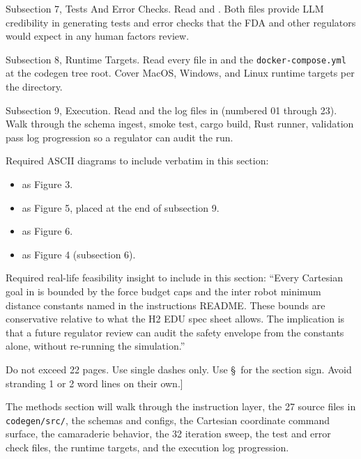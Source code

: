 \begin{sectionaccent}
Subsection 7, Tests And Error Checks. Read
and .
Both files provide LLM credibility in generating tests and error
checks that the FDA and other regulators would expect in any human
factors review.

Subsection 8, Runtime Targets. Read every file in
 and the
\texttt{docker-compose.yml} at the codegen tree root. Cover MacOS,
Windows, and Linux runtime targets per the
 directory.

Subsection 9, Execution. Read
 and the
log files in
(numbered 01 through 23). Walk through the schema ingest, smoke test,
cargo build, Rust runner, validation pass log progression so a
regulator can audit the run.

Required ASCII diagrams to include verbatim in this section:
\begin{itemize}
  \item {} as Figure 3.
  \item {} as
        Figure 5, placed at the end of subsection 9.
  \item {}
        as Figure 6.
  \item {}
        as Figure 4 (subsection 6).
\end{itemize}

Required real-life feasibility insight to include in this section:
``Every Cartesian goal in  is bounded by
the force budget caps and the inter robot minimum distance constants
named in the instructions README. These bounds are conservative
relative to what the H2 EDU spec sheet allows. The implication is
that a future regulator review can audit the safety envelope from
the constants alone, without re-running the simulation.''

Do not exceed 22 pages. Use single dashes only. Use \S\ for the
section sign. Avoid stranding 1 or 2 word lines on their own.]

The methods section will walk through the instruction layer, the 27
source files in \texttt{codegen/src/}, the schemas and configs, the
Cartesian coordinate command surface, the camaraderie behavior, the
32 iteration sweep, the test and error check files, the runtime
targets, and the execution log progression.


\end{sectionaccent}
